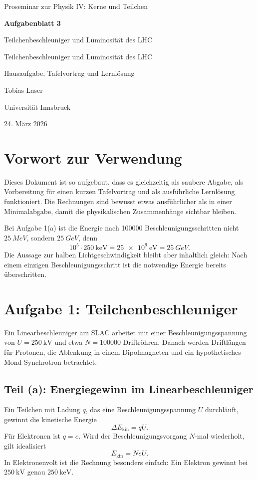 \documentclass[11pt,a4paper]{scrartcl}
\newcommand{\CourseTitle}{Proseminar zur Physik IV: Kerne und Teilchen}
\newcommand{\DocumentKind}{Hausaufgabe, Tafelvortrag und Lernlösung}
\newcommand{\DocumentTitle}{Aufgabenblatt 3}
\newcommand{\DocumentSubtitle}{Teilchenbeschleuniger und Luminosität des LHC}
\newcommand{\AuthorName}{Tobias Laser}
\newcommand{\InstitutionName}{Universität Innsbruck}
\newcommand{\SubmissionDate}{24. März 2026}
\newcommand{\makeuniversitytitle}{%
    \begin{titlepage}
        \centering
        \vspace*{2cm}
        {\Large \CourseTitle\par}
        \vspace{1.2cm}
        {\huge\bfseries \DocumentTitle\par}
        \ifx\DocumentSubtitle\empty\else
            \vspace{0.4cm}
            {\Large \DocumentSubtitle\par}
        \fi
        \vspace{1cm}
        {\Large \DocumentKind\par}
        \vfill
        {\large \AuthorName\par}
        \vspace{0.2cm}
        {\large \InstitutionName\par}
        \vspace{0.8cm}
        {\large \SubmissionDate\par}
    \end{titlepage}
    \pagenumbering{arabic}
}
\newcommand{\MeV}{\si{MeV}}
\newcommand{\GeV}{\si{GeV}}
\theoremstyle{definition}
\theoremstyle{plain}
\theoremstyle{remark}
\begin{document}
\makeuniversitytitle
\tableofcontents
\newpage

\section*{Vorwort zur Verwendung}

Dieses Dokument ist so aufgebaut, dass es gleichzeitig als saubere Abgabe, als Vorbereitung für einen kurzen Tafelvortrag und als ausführliche Lernlösung funktioniert. Die Rechnungen sind bewusst etwas ausführlicher als in einer Minimalabgabe, damit die physikalischen Zusammenhänge sichtbar bleiben.

\begin{warningbox}[title=Wichtige Korrektur gegenüber der ursprünglichen Abgabe]
Bei Aufgabe 1(a) ist die Energie nach \num{100000} Beschleunigungsschritten nicht \(\SI{25}{\MeV}\), sondern
\(\SI{25}{\GeV}\), denn
\[
    10^5 \cdot \SI{250}{\kilo\electronvolt}=\SI{25e9}{\electronvolt}=\SI{25}{\GeV}.
\]
Die Aussage zur halben Lichtgeschwindigkeit bleibt aber inhaltlich gleich: Nach einem einzigen Beschleunigungsschritt ist die notwendige Energie bereits überschritten.
\end{warningbox}

\section{Aufgabe 1: Teilchenbeschleuniger}

\begin{taskbox}
Ein Linearbeschleuniger am SLAC arbeitet mit einer Beschleunigungsspannung von \(U=\SI{250}{\kilo\volt}\) und etwa \(N=\num{100000}\) Driftröhren. Danach werden Driftlängen für Protonen, die Ablenkung in einem Dipolmagneten und ein hypothetisches Mond-Synchrotron betrachtet.
\end{taskbox}

\subsection{Teil (a): Energiegewinn im Linearbeschleuniger}

\begin{definitionbox}[title=Prinzip]
Ein Teilchen mit Ladung \(q\), das eine Beschleunigungsspannung \(U\) durchläuft, gewinnt die kinetische Energie
\[
    \Delta E_{\mathrm{kin}} = qU.
\]
Für Elektronen ist \(q=e\). Wird der Beschleunigungsvorgang \(N\)-mal wiederholt, gilt idealisiert
\[
    E_{\mathrm{kin}} = N e U.
\]
In Elektronenvolt ist die Rechnung besonders einfach: Ein Elektron gewinnt bei \(\SI{250}{\kilo\volt}\) genau \(\SI{250}{\kilo\electronvolt}\).
\end{definitionbox}
\end{document}
